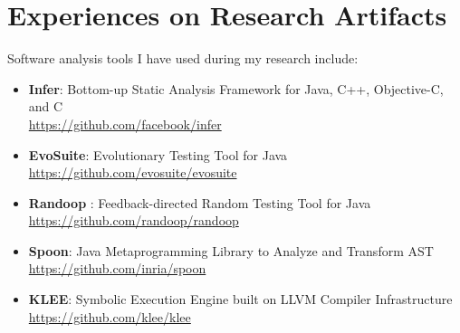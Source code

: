 \clearpage

\section{Experiences on Research Artifacts}
Software analysis tools I have used during my research include:
\vspace{1mm}
\begin{itemize}
\item \textbf{Infer}: Bottom-up Static Analysis Framework for Java, C++, Objective-C, and C \\
\url{https://github.com/facebook/infer}
\vspace{1mm}
\item \textbf{EvoSuite}: Evolutionary Testing Tool for Java \\
\url{https://github.com/evosuite/evosuite}
\vspace{1mm}
\item \textbf{Randoop} : Feedback-directed Random Testing Tool for Java \\
\url{https://github.com/randoop/randoop}
\vspace{1mm}
\item \textbf{Spoon}: Java Metaprogramming Library to Analyze and Transform AST \\
\url{https://github.com/inria/spoon}
\vspace{1mm}
\item \textbf{KLEE}: Symbolic Execution Engine built on LLVM Compiler Infrastructure \\
\url{https://github.com/klee/klee}
\end{itemize}

\vspace{9mm}
